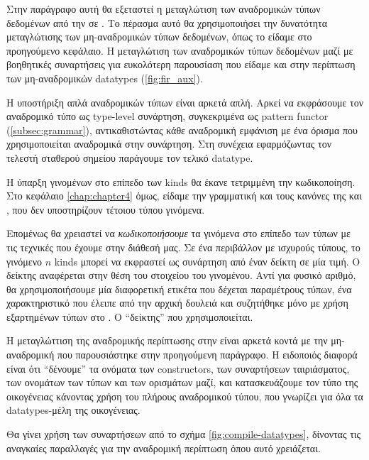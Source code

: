 

Στην παράγραφο αυτή θα εξεταστεί η μεταγλώτιση των αναδρομικών τύπων δεδομένων
από την \FIR{}  σε \FOMF. Το πέρασμα αυτό θα χρησιμοποιήσει την δυνατότητα
μεταγλώτισης των μη-αναδρομικών τύπων δεδομένων, όπως το είδαμε στο προηγούμενο
κεφάλαιο. Η μεταγλώτιση των αναδρομικών τύπων δεδομένων μαζί με βοηθητικές
συναρτήσεις για ευκολότερη παρουσίαση που είδαμε και στην περίπτωση των
μη-αναδρομικών datatypes (\ref{fig:fir_aux}).


Η υποστήριξη απλά αναδρομικών τύπων είναι αρκετά απλή. Αρκεί να εκφράσουμε τον
αναδρομικό τύπο ως type-level συνάρτηση, συγκεκριμένα ως pattern functor
(\ref{subsec:grammar}), αντικαθιστώντας κάθε αναδρομική εμφάνιση με ένα όρισμα
που χρησιμοποιείται αναδρομικά στην συνάρτηση. Στη συνέχεια εφαρμόζωντας τον
τελεστή σταθερού σημείου παράγουμε τον τελικό datatype.

Η ύπαρξη γινομένων στο επίπεδο των kinds θα έκανε τετριμμένη την κωδικοποίηση.
Στο κεφάλαιο \ref{chap:chapter4} όμως, είδαμε την γραμματική και τους κανόνες
της \FOMF{} και \FIR{}, που δεν υποστηρίζουν τέτοιου τύπου γινόμενα.

Επομένως θα χρειαστεί να \emph{κωδικοποιήσουμε} τα γινόμενα στο επίπεδο των
τύπων με τις τεχνικές που έχουμε στην διάθεσή μας. Σε ένα περιβάλλον με
ισχυρούς τύπους, το γινόμενο $n$ kinds μπορεί να εκφραστεί ως συνάρτηση από
έναν δείκτη σε μία τιμή. Ο δείκτης αναφέρεται στην θέση του στοιχείου του
γινομένου. Αντί για φυσικό αριθμό, θα χρησιμοποιήσουμε μία διαφορετική ετικέτα
που δέχεται παραμέτρους τύπων, ένα χαρακτηριστικό που έλειπε από την αρχική
δουλειά \cite{fixmutualgeneric} και συζητήθηκε μόνο με χρήση εξαρτημένων τύπων
στο \cite{genericwithindexed}. Ο ``δείκτης'' που χρησιμοποιείται.


Η μεταγλώττιση της αναδρομικής περίπτωσης στην \FIR{} είναι αρκετά κοντά με την
μη-αναδρομική που παρουσιάστηκε στην προηγούμενη παράγραφο. Η ειδοποιός διαφορά
είναι ότι ``δένουμε'' τα ονόματα των constructors, των συναρτήσεων ταιριάσματος,
των ονομάτων των τύπων και των ορισμάτων μαζί, και κατασκευάζουμε τον τύπο της
οικογένειας κάνοντας χρήση του πλήρους αναδρομικού τύπου, που γνωρίζει για όλα
τα datatypes-μέλη της οικογένειας.


Θα γίνει χρήση των συναρτήσεων από το σχήμα \cref{fig:compile-datatypes},
δίνοντας τις αναγκαίες παραλλαγές για την αναδρομική περίπτωση όπου αυτό
χρειάζεται.

